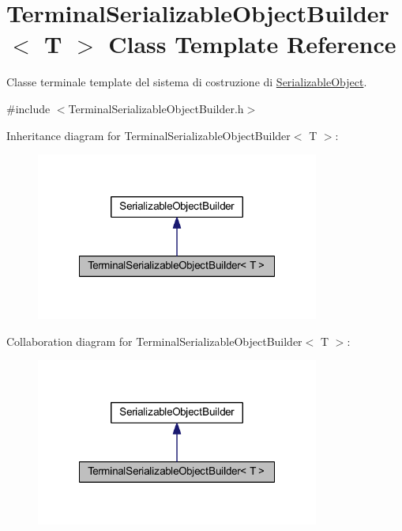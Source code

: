 \hypertarget{class_terminal_serializable_object_builder}{
\section{TerminalSerializableObjectBuilder$<$ T $>$ Class Template Reference}
\label{class_terminal_serializable_object_builder}
}


Classe terminale template del sistema di costruzione di \hyperlink{class_serializable_object}{SerializableObject}.  




{\ttfamily \#include $<$TerminalSerializableObjectBuilder.h$>$}



Inheritance diagram for TerminalSerializableObjectBuilder$<$ T $>$:\nopagebreak
\begin{figure}[H]
\begin{center}
\leavevmode
\includegraphics[width=264pt]{class_terminal_serializable_object_builder__inherit__graph}
\end{center}
\end{figure}


Collaboration diagram for TerminalSerializableObjectBuilder$<$ T $>$:\nopagebreak
\begin{figure}[H]
\begin{center}
\leavevmode
\includegraphics[width=264pt]{class_terminal_serializable_object_builder__coll__graph}
\end{center}
\end{figure}
